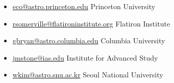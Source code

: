 \documentclass[12pt,preprint,letter]{aastex63}
\begin{document}
\begin{itemize}%
\item \subtitle{Eve C. Ostriker} \url{eco@astro.princeton.edu} Princeton University

\item \subtitle{Rachel S. Somerville} \url{rsomerville@flatironinstitute.org} Flatiron Institute

\item \subtitle{Greg L. Bryan} \url{gbryan@astro.columbia.edu} Columbia University

\item \subtitle{James M. Stone} \url{jmstone@ias.edu} Institute for Advanced Study

\item \subtitle{Woong-Tae Kim} \url{wkim@astro.snu.ac.kr} Seoul National University



\end{itemize}
\end{document}
